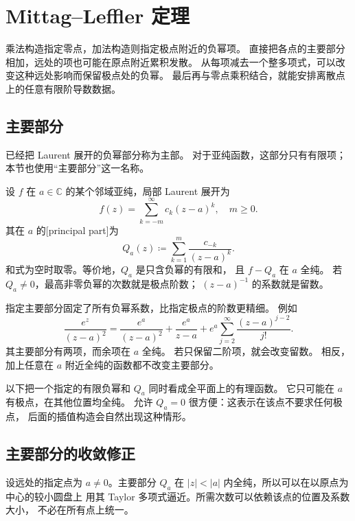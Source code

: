 \section{Mittag–Leffler 定理}
\label{b3:sec:2004}

乘法构造指定零点，加法构造则指定极点附近的负幂项。
直接把各点的主要部分相加，远处的项也可能在原点附近累积发散。
从每项减去一个整多项式，可以改变这种远处影响而保留极点处的负幂。
最后再与零点乘积结合，就能安排离散点上的任意有限阶导数数据。

\subsection{主要部分}
\label{b3:subsec:200401}

已经把 Laurent 展开的负幂部分称为主部。
对于亚纯函数，这部分只有有限项；本节也使用“主要部分”这一名称。

\begin{definition}[主要部分]\label{b3:def:20-principal-part}
设 \(f\) 在 \(a\in\mathbb C\) 的某个邻域亚纯，局部 Laurent 展开为
\[
 f(z)=\sum_{k=-m}^\infty c_k(z-a)^k,\quad m\ge0.
\]
其在 \(a\) 的[principal part]为
\[
 Q_a(z)\coloneqq\sum_{k=1}^m\frac{c_{-k}}{(z-a)^k}.
\]
和式为空时取零。等价地，\(Q_a\) 是只含负幂的有限和，
且 \(f-Q_a\) 在 \(a\) 全纯。
若 \(Q_a\ne0\)，最高非零负幂的次数就是极点阶数；
\((z-a)^{-1}\) 的系数就是留数。
\end{definition}

指定主要部分固定了所有负幂系数，比指定极点的阶数更精细。
例如
\[
 \frac{e^z}{(z-a)^2}
 =\frac{e^a}{(z-a)^2}+\frac{e^a}{z-a}
   +e^a\sum_{j=2}^\infty\frac{(z-a)^{j-2}}{j!}.
\]
其主要部分有两项，而余项在 \(a\) 全纯。
若只保留二阶项，就会改变留数。
相反，加上任意在 \(a\) 附近全纯的函数都不改变主要部分。

\ProseParagraphBreak
以下把一个指定的有限负幂和 \(Q_a\) 同时看成全平面上的有理函数。
它只可能在 \(a\) 有极点，在其他位置均全纯。
允许 \(Q_a=0\) 很方便：这表示在该点不要求任何极点，
后面的插值构造会自然出现这种情形。

\subsection{主要部分的收敛修正}
\label{b3:subsec:200402}

设远处的指定点为 \(a\ne0\)。主要部分 \(Q_a\) 在
\(|z|<|a|\) 内全纯，所以可以在以原点为中心的较小圆盘上
用其 Taylor 多项式逼近。所需次数可以依赖该点的位置及系数大小，
不必在所有点上统一。

